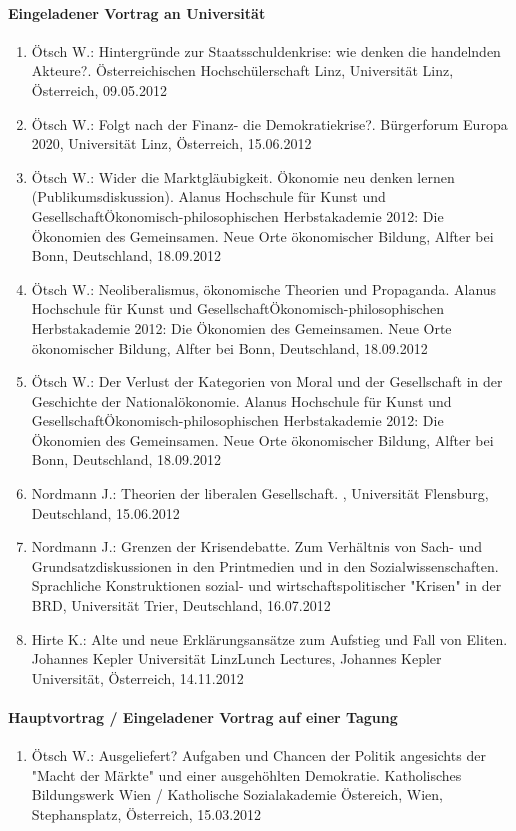 \paragraph{Eingeladener Vortrag an Universität}
\begin{enumerate}
	\item Ötsch W.: Hintergründe zur Staatsschuldenkrise: wie denken die handelnden Akteure?. Österreichischen Hochschülerschaft Linz, Universität Linz, Österreich, 09.05.2012
	\item Ötsch W.: Folgt nach der Finanz- die Demokratiekrise?. Bürgerforum Europa 2020, Universität Linz, Österreich, 15.06.2012
	\item Ötsch W.: Wider die Marktgläubigkeit. Ökonomie neu denken lernen (Publikumsdiskussion). Alanus Hochschule für Kunst und GesellschaftÖkonomisch-philosophischen Herbstakademie 2012: Die Ökonomien des Gemeinsamen. Neue Orte ökonomischer Bildung, Alfter bei Bonn, Deutschland, 18.09.2012
	\item Ötsch W.: Neoliberalismus, ökonomische Theorien und Propaganda. Alanus Hochschule für Kunst und GesellschaftÖkonomisch-philosophischen Herbstakademie 2012: Die Ökonomien des Gemeinsamen. Neue Orte ökonomischer Bildung, Alfter bei Bonn, Deutschland, 18.09.2012
	\item Ötsch W.: Der Verlust der Kategorien von Moral und der Gesellschaft in der Geschichte der Nationalökonomie. Alanus Hochschule für Kunst und GesellschaftÖkonomisch-philosophischen Herbstakademie 2012: Die Ökonomien des Gemeinsamen. Neue Orte ökonomischer Bildung, Alfter bei Bonn, Deutschland, 18.09.2012
	\item Nordmann J.: Theorien der liberalen Gesellschaft. , Universität Flensburg, Deutschland, 15.06.2012
	\item Nordmann J.: Grenzen der Krisendebatte. Zum Verhältnis von Sach- und Grundsatzdiskussionen in den Printmedien und in den Sozialwissenschaften. Sprachliche Konstruktionen sozial- und wirtschaftspolitischer "Krisen" in der BRD, Universität Trier, Deutschland, 16.07.2012
	\item Hirte K.: Alte und neue Erklärungsansätze zum Aufstieg und Fall von Eliten. Johannes Kepler Universität LinzLunch Lectures, Johannes Kepler Universität, Österreich, 14.11.2012
\end{enumerate}
\paragraph{Hauptvortrag / Eingeladener Vortrag auf einer Tagung}
\begin{enumerate}
	\item Ötsch W.: Ausgeliefert? Aufgaben und Chancen der Politik angesichts der "Macht der Märkte" und einer ausgehöhlten Demokratie. Katholisches Bildungswerk Wien / Katholische Sozialakademie Östereich, Wien, Stephansplatz, Österreich, 15.03.2012
\end{enumerate}

